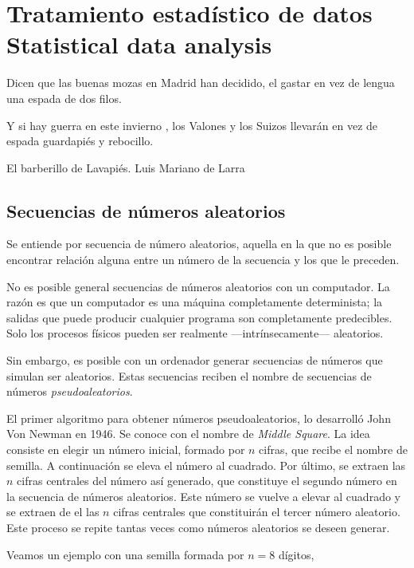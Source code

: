 \chapter{Tratamiento estadístico de datos\\ Statistical data analysis}
\epigraph{Dicen que las buenas mozas en Madrid han decidido, el gastar en vez de lengua una espada de dos filos.

Y si hay guerra en este invierno , los Valones y los Suizos llevarán en vez de espada guardapiés y rebocillo.}{El barberillo de Lavapiés. Luis Mariano de Larra}
\begin{paracol}{2}
\section{Secuencias de números aleatorios}
Se entiende por secuencia de número aleatorios, aquella en la que no es posible encontrar relación alguna entre un número de la secuencia y los que le preceden.

No es posible general secuencias de números aleatorios con un computador. La razón es que un computador es una máquina completamente determinista; la salidas que puede producir cualquier programa son completamente predecibles. Solo los procesos físicos pueden ser realmente ---intrínsecamente--- aleatorios.

Sin embargo, es posible con un ordenador generar secuencias de números que simulan ser aleatorios. Estas secuencias reciben el nombre de secuencias de números \emph{pseudoaleatorios}.

El primer algoritmo para obtener números pseudoaleatorios, lo desarrolló John Von Newman en 1946. Se conoce con el nombre de \emph{Middle Square}. La idea consiste en elegir un número inicial, formado por $n$ cifras, que recibe el nombre de semilla. A continuación se eleva el número al cuadrado. Por último, se extraen las $n$ cifras centrales del número así generado, que constituye el segundo número en la secuencia de números aleatorios. Este número se vuelve a elevar al cuadrado y se extraen de el las $n$ cifras centrales que constituirán el tercer número aleatorio. Este proceso se repite tantas veces como números aleatorios se deseen generar.

Veamos un ejemplo con una semilla  formada por $n=8$ dígitos,
\switchcolumn

\end{paracol}

